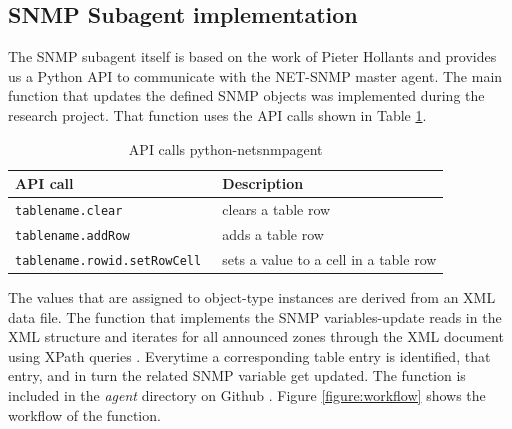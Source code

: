 \subsection{SNMP Subagent implementation}
\label{section:sub-agent-implementation}
The SNMP subagent itself is based on the work of Pieter Hollants \cite{pythonnetsnmpagent} and provides us a Python API to communicate with the NET-SNMP master agent. The main function that updates the defined SNMP objects was implemented during the research project. That function uses the API calls shown in Table \ref{table:api-calls}.

\begin{table}[H]
	\centering
\begin{tabular}{|l|p{5.5cm}|}

\hline 
\textbf{API call} & \textbf{Description} \\ 
\hline 
\tt{tablename.clear} & clears a table row\\ 
\hline 
\tt{tablename.addRow} & adds a table row\\ 
\hline 
\tt{tablename.rowid.setRowCell} & sets a value to a cell in a table row\\ 
\hline 
\end{tabular} 
\caption{API calls python-netsnmpagent}
\label{table:api-calls}
\end{table}

The values that are assigned to object-type instances are derived from an XML data file. The function that implements the SNMP variables-update reads in the XML structure and iterates for all announced zones through the XML document using XPath queries \citep{xpath}. Everytime a corresponding table  entry is identified, that entry, and in turn the related SNMP variable get updated. The function is included in the \textit{agent} directory on Github \cite{github}. Figure \ref{figure:workflow} shows the  workflow of the function.

